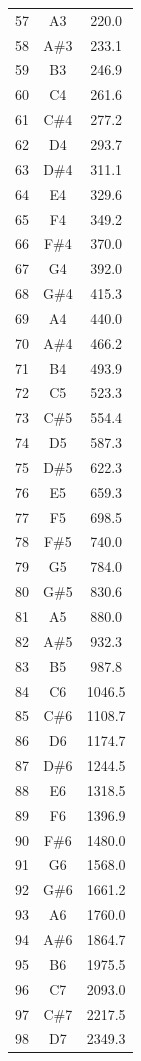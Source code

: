 \documentclass[10pt]{book}
\begin{document}
\begin{CJK}{UTF8}{gkai}
\begin{spacing}{0.99}
\begin{supertabular}{ccc}
57  & A3  & 220.0  \\
58  & A\#3 & 233.1  \\
59  & B3  & 246.9  \\
60  & C4  & 261.6  \\
61  & C\#4 & 277.2  \\
62  & D4  & 293.7  \\
63  & D\#4 & 311.1  \\
64  & E4  & 329.6  \\
65  & F4  & 349.2  \\
66  & F\#4 & 370.0  \\
67  & G4  & 392.0  \\
68  & G\#4 & 415.3  \\
69  & A4  & 440.0  \\
70  & A\#4 & 466.2  \\
71  & B4  & 493.9  \\
72  & C5  & 523.3  \\
73  & C\#5 & 554.4  \\
74  & D5  & 587.3  \\
75  & D\#5 & 622.3  \\
76  & E5  & 659.3  \\
77  & F5  & 698.5  \\
78  & F\#5 & 740.0  \\
79  & G5  & 784.0  \\
80  & G\#5 & 830.6  \\
81  & A5  & 880.0  \\
82  & A\#5 & 932.3  \\
83  & B5  & 987.8  \\
84  & C6  & 1046.5 \\
85  & C\#6 & 1108.7 \\
86  & D6  & 1174.7 \\
87  & D\#6 & 1244.5 \\
88  & E6  & 1318.5 \\
89  & F6  & 1396.9 \\
90  & F\#6 & 1480.0 \\
91  & G6  & 1568.0 \\
92  & G\#6 & 1661.2 \\
93  & A6  & 1760.0 \\
94  & A\#6 & 1864.7 \\
95  & B6  & 1975.5 \\
96  & C7  & 2093.0 \\
97  & C\#7 & 2217.5 \\
98  & D7  & 2349.3 \\

\end{supertabular}
\end{spacing}
\end{CJK}
\end{document}
